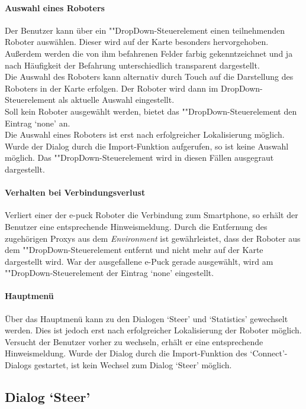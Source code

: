 \documentclass[10pt,a4paper]{article}
\begin{document}
	\paragraph*{Auswahl eines Roboters} Der Benutzer kann über ein ""Drop\-Down-Steu\-er\-ele\-ment einen teilnehmenden Roboter auswählen. Dieser
	wird auf der Karte besonders hervorgehoben. Außerdem werden die von ihm befahrenen Felder farbig gekenntzeichnet und ja nach Häufigkeit der
	Befahrung unterschiedlich transparent dargestellt. \\
	Die Auswahl des Roboters kann alternativ durch Touch auf die Darstellung des Roboters in der Karte erfolgen. Der Roboter wird dann im
	DropDown-Steuerelement als aktuelle Auswahl eingestellt. \\
	Soll kein Roboter ausgewählt werden, bietet das ""Drop\-Down-Steu\-er\-ele\-ment den Eintrag `none' an. \\ 
	Die Auswahl eines Roboters ist erst nach erfolgreicher Lokalisierung möglich. Wurde der Dialog durch die Import-Funktion aufgerufen, so ist keine
	Auswahl möglich. Das ""Drop\-Down-Steu\-er\-ele\-ment wird in diesen Fällen ausgegraut dargestellt.
	
	\paragraph*{Verhalten bei Verbindungsverlust} Verliert einer der e-puck Roboter die Verbindung zum Smartphone, so erhält der Benutzer eine
	entsprechende Hinweismeldung. Durch die Entfernung des zugehörigen Proxys aus dem \textit{Environment} ist gewährleistet, dass der Roboter aus
	dem ""Drop\-Down-Steu\-er\-ele\-ment entfernt und nicht mehr auf der Karte dargestellt wird. War der ausgefallene e-Puck gerade ausgewählt, wird
	am ""Drop\-Down-Steu\-er\-ele\-ment der Eintrag `none' eingestellt.
	
	\paragraph*{Hauptmenü} Über das Hauptmenü kann zu den Dialogen `Steer' und `Statistics' gewechselt werden. Dies ist jedoch erst nach
	erfolgreicher Lokalisierung der Roboter möglich. Versucht der Benutzer vorher zu wechseln, erhält er eine entsprechende Hinweismeldung.
	Wurde der Dialog durch die Import-Funktion des `Connect'-Dialogs gestartet, ist kein Wechsel zum Dialog `Steer' möglich.

	\subsection*{Dialog `Steer'}
	
\end{document}
